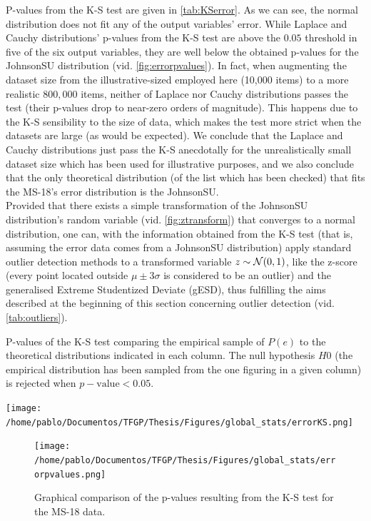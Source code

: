 %
\indent P-values from the K-S test are given in \autoref{tab:KSerror}. As we can see, the normal distribution does not fit any of the output variables' error. While Laplace and Cauchy distributions' p-values from the K-S test are above the $0.05$ threshold in five of the six output variables, they are well below the obtained p-values for the JohnsonSU\cite{jones2009sinh} distribution (vid. \autoref{fig:errorpvalues}). In fact, when augmenting the dataset size from the illustrative-sized employed here (10,000 items) to a more realistic $800,000$ items, neither of Laplace nor Cauchy distributions passes the test (their p-values drop to near-zero orders of magnitude). This happens due to the K-S sensibility to the size of data, which makes the test more strict when the datasets are large (as would be expected). We conclude that the Laplace and Cauchy distributions just pass the K-S anecdotally for the unrealistically small dataset size which has been used for illustrative purposes, and we also conclude that the only theoretical distribution (of the list which has been checked) that fits the MS-18's error distribution is the JohnsonSU.\\
%
\indent Provided that there exists a simple transformation of the JohnsonSU distribution's random variable (vid. \autoref{fig:ztransform}) that converges to a normal distribution, one can, with the information obtained from the K-S test (that is, assuming the error data comes from a JohnsonSU distribution) apply standard outlier detection methods to a transformed variable $z\sim {\cal{N}}(0,1)$, like the z-score (every point located outside $\mu\pm 3\sigma$ is considered to be an outlier) and the generalised Extreme Studentized Deviate\cite{rosner1983percentage} (gESD), thus fulfilling the aims described at the beginning of this section concerning outlier detection (vid. \autoref{tab:outliers}).\\
\begin{table}[!htb]
	\centering
	\caption{P-values of the K-S test comparing the empirical sample of $P(e)$ to the theoretical distributions indicated in each column. The null hypothesis $H0$ (the empirical distribution has been sampled from the one figuring in a given column) is rejected when $p-\text{value}<0.05$.}
	\texttt{[image: /home/pablo/Documentos/TFGP/Thesis/Figures/global\_stats/errorKS.png]}
	\label{tab:KSerror}
\end{table}
\begin{figure}[!htb]
	\centering
	\texttt{[image: /home/pablo/Documentos/TFGP/Thesis/Figures/global\_stats/errorpvalues.png]}
	\caption{Graphical comparison of the p-values resulting from the K-S test for the MS-18 data.}
	\label{fig:errorpvalues}
\end{figure}
